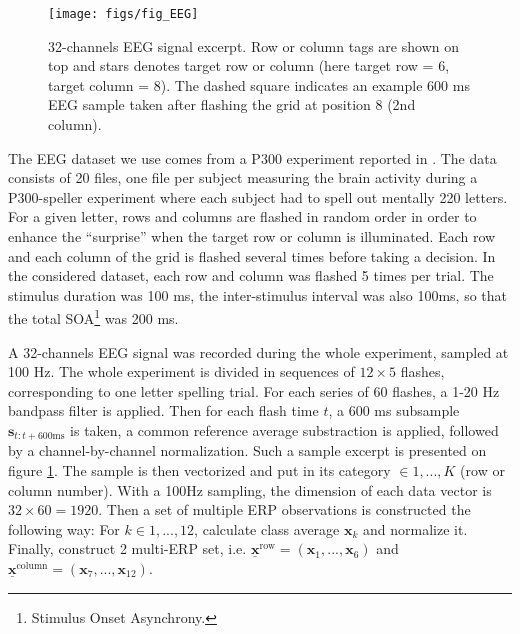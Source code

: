 \documentclass[conference]{IEEEtran}
\begin{document}
\begin{figure}
\centerline{
 \texttt{[image: figs/fig\_EEG]}
}
\caption{32-channels EEG signal excerpt. 
Row or column tags are shown on top and stars denotes target row or column (here target row = 6, target column = 8).
The dashed square indicates an example 600 ms EEG sample taken after flashing the grid at position 8 (2nd column).}
\label{fig:EEG}
\end{figure}

The EEG dataset we use comes from a P300 experiment reported in \cite{Maby10}. 
The data consists of 20 files, one file per subject
measuring the brain activity during a P300-speller
experiment where
each subject had to spell out mentally 220 letters. 
For a given letter, rows and columns are flashed in random order
in order to enhance the ``surprise'' when the target row or column
is illuminated.
Each row and each column of the grid 
is flashed several times before taking a decision.
In the considered dataset, each row and column was flashed 5 times per trial.
The stimulus duration was 100 ms, the inter-stimulus interval was also 100ms,
so that the total SOA\footnote{Stimulus Onset Asynchrony.} was 200 ms.

A 32-channels EEG signal was recorded during the whole experiment, sampled at 100 Hz.
The whole experiment is divided in sequences of $12 \times 5$  flashes, corresponding to one letter spelling trial.
For each series of 60 flashes,  a 1-20 Hz bandpass filter is applied.
Then for each flash time $t$, a 600 ms subsample $\mathbf{s}_{t:t+600 \text{ms}}$ is taken, 
a common reference average substraction is applied, followed by a channel-by-channel normalization.
Such a sample excerpt is presented on figure \ref{fig:EEG}.
The sample is then vectorized and put in its category $\in {1,...,K}$ (row or column number).
With a 100Hz sampling, the dimension of each  data vector is $32 \times 60 = 1920$.
Then a set of multiple ERP observations is constructed the following way:
For $k \in 1,...,12$, calculate class average $\boldsymbol{x}_k$ and normalize it.
Finally, construct 2 multi-ERP set, i.e. $\underline{\mathbf{x}}^\text{row} = (\boldsymbol{x}_1,...,\boldsymbol{x}_6)$ 
and $\underline{\mathbf{x}}^\text{column} = (\boldsymbol{x}_7,...,\boldsymbol{x}_{12})$.
\end{document}
